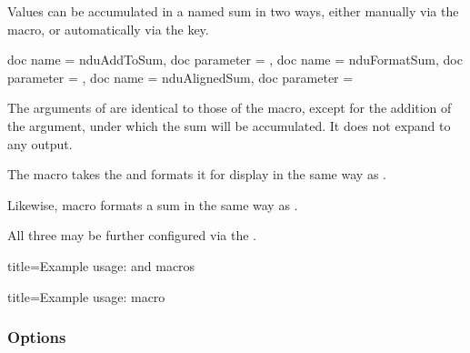 \documentclass{article}
\begin{document}
Values can be accumulated in a named sum in two ways, either manually via the  macro, or automatically via the  key.

\begin{docCommands}[]{
	{
		doc name = nduAddToSum,
		doc parameter = 
	},
	{
		doc name = nduFormatSum,
		doc parameter = 
	},
	{
		doc name = nduAlignedSum,
		doc parameter = 
	}
}

The arguments of  are identical to those of the  macro, except for the addition of the  argument, under which the sum will be accumulated. It does not expand to any output.

The  macro takes the  and formats it for display in the same way as .

Likewise,  macro formats a sum in the same way as .

All three may be further configured via the .

\begin{dispExample*}{
	title=Example usage:  and  macros
}
\end{dispExample*}

\begin{dispExample*}{
	title=Example usage:  macro
}
\\
\end{dispExample*}
\end{docCommands}

\clearpage
\subsubsection{Options}
\end{document}
